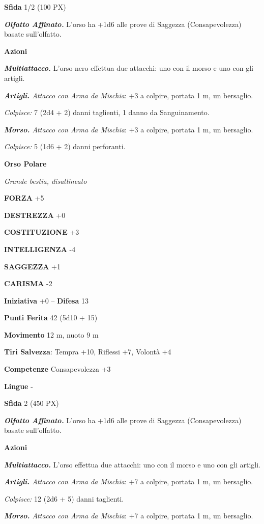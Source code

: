 \begin{multicols}{2}
\textbf{Sfida} 1/2 (100 PX)

\textit{\textbf{Olfatto Affinato.}} L'orso ha +1d6 alle prove di Saggezza (Consapevolezza) basate sull'olfatto.

\textbf{Azioni}

\textit{\textbf{Multiattacco.}} L'orso nero effettua due attacchi: uno con il morso e uno con gli artigli.

\textit{\textbf{Artigli.} Attacco con Arma da Mischia}: +3 a colpire, portata 1 m, un bersaglio.

\textit{Colpisce:} 7 (2d4 + 2) danni taglienti, 1 danno da Sanguinamento.

\textit{\textbf{Morso.} Attacco con Arma da Mischia}: +3 a colpire, portata 1 m, un bersaglio.

\textit{Colpisce:} 5 (1d6 + 2) danni perforanti.

\medskip\textbf{Orso Polare}

\textit{Grande bestia, disallineato}

\textbf{FORZA} +5

\textbf{DESTREZZA} +0

\textbf{COSTITUZIONE} +3

\textbf{INTELLIGENZA} -4

\textbf{SAGGEZZA} +1

\textbf{CARISMA} -2

\textbf{Iniziativa} +0 -- \textbf{Difesa} 13

\textbf{Punti Ferita} 42 (5d10 + 15)

\textbf{Movimento} 12 m, nuoto 9 m

\textbf{Tiri Salvezza}: Tempra +10, Riflessi +7, Volontà +4

\textbf{Competenze} Consapevolezza +3

\textbf{Lingue} -

\textbf{Sfida} 2 (450 PX)

\textit{\textbf{Olfatto Affinato.}} L'orso ha +1d6 alle prove di Saggezza (Consapevolezza) basate sull'olfatto.

\textbf{Azioni}

\textit{\textbf{Multiattacco.}} L'orso effettua due attacchi: uno con il morso e uno con gli artigli.

\textit{\textbf{Artigli.} Attacco con Arma da Mischia}: +7 a colpire, portata 1 m, un bersaglio.

\textit{Colpisce:} 12 (2d6 + 5) danni taglienti.

\textit{\textbf{Morso.} Attacco con Arma da Mischia}: +7 a colpire, portata 1 m, un bersaglio.


\end{multicols}
